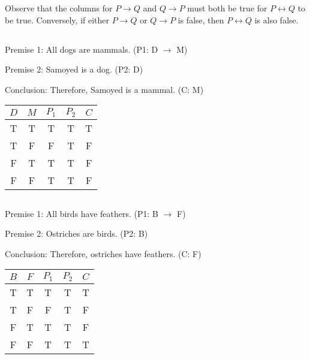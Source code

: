 \documentclass[UTF8,a4paper,AutoFakeBold,AutoFakeSlant]{article}
\begin{document}
Observe that the columns for \( P \rightarrow Q \) and \( Q \rightarrow P \) must both be true 
for \( P \leftrightarrow Q \) to be true. Conversely, if either \( P \rightarrow Q \) or 
\( Q \rightarrow P \) is false, then \( P \leftrightarrow Q \) is also false.



\subsection{}

Premise 1: All dogs are mammals. (P1: D $\rightarrow$ M)

Premise 2: Samoyed is a dog. (P2: D)

Conclusion: Therefore, Samoyed is a mammal. (C: M)

\begin{table}[H]
    \centering
    \begin{tabular}{|c|c|c|c|c|}
    \hline
    $D$ & $M$ & $P_1$ & $P_2$ & $C$ \\ \hline
    T & T & T & T & T \\ \hline
    T & F & F & T & F \\ \hline
    F & T & T & T & F \\ \hline
    F & F & T & T & F \\ \hline
    \end{tabular}
\end{table}


\subsection{}

Premise 1: All birds have feathers. (P1: B $\rightarrow$ F)

Premise 2: Ostriches are birds. (P2: B)

Conclusion: Therefore, ostriches have feathers. (C: F)

\begin{table}[ht]
    \centering
    \begin{tabular}{|c|c|c|c|c|}
    \hline
    $B$ & $F$ & $P_1$ & $P_2$ & $C$ \\ \hline
    T & T & T & T & T \\ \hline
    T & F & F & T & F \\ \hline
    F & T & T & T & F \\ \hline
    F & F & T & T & T \\ \hline
    \end{tabular}
\end{table}
    
\end{document}
